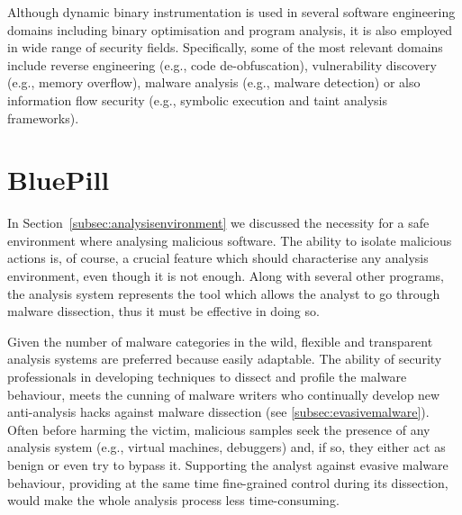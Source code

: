 \documentclass[LaM,binding=0.6cm]{sapthesis}
\begin{document}
Although dynamic binary instrumentation is used in several software engineering domains including binary optimisation and program analysis, it is also employed in wide range of security fields. Specifically, some of the most relevant domains include reverse engineering (e.g., code de-obfuscation), vulnerability discovery (e.g., memory overflow), malware analysis (e.g., malware detection) or also information flow security (e.g., symbolic execution and taint analysis frameworks).

\section{BluePill}
\label{sec:bluepill}
In Section~\ref{subsec:analysisenvironment} we discussed the necessity for a safe environment where analysing malicious software. The ability to isolate malicious actions is, of course, a crucial feature which should characterise any analysis environment, even though it is not enough. Along with several other programs, the analysis system represents the tool which allows the analyst to go through malware dissection, thus it must be effective in doing so.

Given the number of malware categories in the wild, flexible and transparent analysis systems are preferred because easily adaptable. The ability of security professionals in developing techniques to dissect and profile the malware behaviour, meets the cunning of malware writers who continually develop new anti-analysis hacks against malware dissection (see \autoref{subsec:evasivemalware}). Often before harming the victim, malicious samples seek the presence of any analysis system (e.g., virtual machines, debuggers) and, if so, they either act as benign or even try to bypass it. Supporting the analyst against evasive malware behaviour, providing at the same time fine-grained control during its dissection, would make the whole analysis process less time-consuming.
\end{document}
